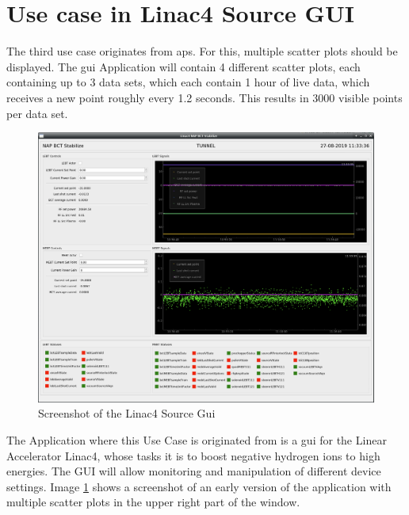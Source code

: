 \section{Use case in Linac4 Source GUI}
\label{sec:usecases:linac}

The third use case originates from \gls{aps}. For this, multiple scatter plots
should be displayed. The \gls{gui} Application will contain 4 different scatter
plots, each containing up to 3 data sets, which each contain 1 hour of live
data, which receives a new point roughly every 1.2 seconds. This results in 3000
visible points per data set.

\begin{figure}[h]
    \centering
    \includegraphics[width=15cm]{resources/img/Linac4SourceGui}
    \caption{Screenshot of the Linac4 Source Gui}
    \label{fig:linac4sourcegui}
\end{figure}

The Application where this Use Case is originated from is a \gls{gui} for the
Linear Accelerator Linac4, whose tasks it is to boost negative hydrogen ions to
high energies. The GUI will allow monitoring and manipulation of different
device settings. Image \ref{fig:linac4sourcegui} shows a screenshot of an early
version of the application with multiple scatter plots in the upper right part
of the window.
\cite{LinacFour,LinacFourGuiPres}

